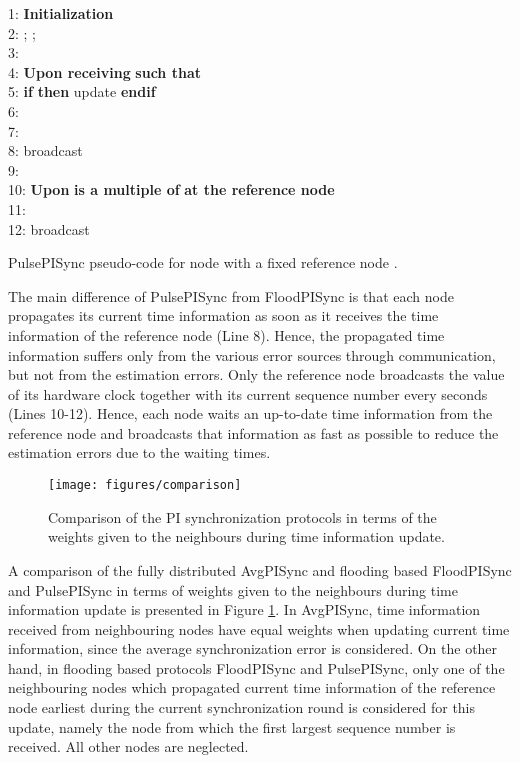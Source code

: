 \documentclass[english,a4paper,10pt,final]{article}
\numberwithin{equation}{section}
\numberwithin{figure}{section}
\begin{document}
\begin{algorithm}

\label{alg:PulsePI}
1:  \textbf{Initialization} \\
2: ; ;   \\
3: \\
4:  \textbf{Upon receiving}  \textbf{such that}  \\
5: \textbf{if}  \textbf{then} update  \textbf{endif}\\
6:    \\
7:    \\ 
8:	 broadcast \\
9: \\
10:  \textbf{Upon}  \textbf{is a multiple of } \textbf{at the reference node }\\
11:  \\
12: broadcast 
\caption{PulsePISync pseudo-code for node  with a fixed reference node .}
\end{algorithm}

The main difference of PulsePISync from FloodPISync is that each node propagates its current time information as soon as it receives the time information of the reference node (Line 8). Hence, the propagated time information suffers only from the various error sources through communication, but not from the estimation errors. Only the reference node   broadcasts the value of its hardware clock together with its current sequence number every  seconds (Lines 10-12). Hence, each node waits an up-to-date time information from the reference node and broadcasts that information as fast as possible to reduce the estimation errors due to the waiting times.

\begin{figure} 
\center

\texttt{[image: figures/comparison]}

\caption{\label{fig:comparison} Comparison of the PI synchronization protocols in terms of the weights given to the neighbours during time information update.}
\end{figure}

A comparison of the fully distributed AvgPISync and flooding based FloodPISync and PulsePISync in terms of weights given to the neighbours during time information update is presented in Figure \ref{fig:comparison}. In AvgPISync, time information received from neighbouring nodes have equal weights when updating current time information, since the average synchronization error is considered. On the other hand, in flooding based protocols FloodPISync and PulsePISync, only one of the neighbouring nodes which propagated current time information of the reference node earliest during the current synchronization round is considered for this update, namely the node from which the first largest sequence number is received. All other nodes are neglected. 
\end{document}
